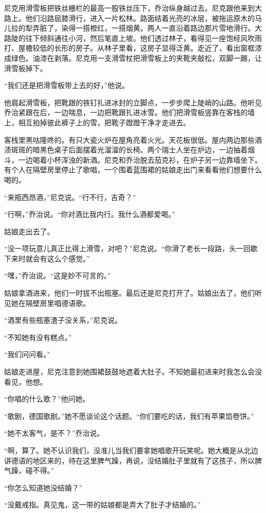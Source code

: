 尼克用滑雪板把铁丝栅栏的最高一股铁丝压下，乔治纵身越过去。尼克跟他来到大路上。他们沿路屈膝滑行，进入一片松林。路面结着光亮的冰层，被拖运原木的马儿拉的犁弄脏了，染得一搭橙红，一搭烟黄。两人一直沿着路边那片雪地滑行。大路陡的往下倾斜通往小河，然后笔直上坡。他们透过林子，看得见一座饱经风吹雨打、屋檐较低的长形的房子。从林子里看，这房子显得泛黄。走近了，看出窗框漆成绿色。油漆在剥落。尼克用一支滑雪杖把滑雪板上的夹靴夹敲松，双脚一踢，让滑雪板掉下。

“我们还是把滑雪板带上去的好，”他说。

他肩起滑雪板，把靴跟的铁钉扎进冰封的立脚点，一步步爬上陡峭的山路。他听见乔治紧跟在后，一边喘息，一边把靴跟扎进冰雪。他们把滑雪板竖靠在客栈的墙上，相互拍掉彼此裤子上的雪，把靴子蹬蹬干净才走进去。

客栈里黑咕隆咚的。有只大瓷火炉在屋角亮着火光。天花板很低。屋内两边那些酒渍斑斑的暗黑色桌子后面摆着光溜溜的长椅。两个瑞士人坐在炉边，一边抽着烟斗，一边喝着小杯浑浊的新酒。尼克和乔治脱去茄克衫，在炉子另一边靠墙坐下。有个人在隔壁房里停止了歌唱，一个围着蓝围裙的姑娘走出门来看看他们想要什么喝的。

“来瓶西昂酒，”尼克说。“行不行，吉奇？”

“行啊，”乔治说。“你对酒比我内行。我什么酒都爱喝。”

姑娘走出去了。

“没一项玩意儿真正比得上滑雪，对吧？”尼克说。“你滑了老长一段路，头一回歇下来时就会有这么个感觉。”

“嘿，”乔治说。“这是妙不可言的。”

姑娘拿酒进来，他们一时拔不出瓶塞。最后还是尼克打开了。姑娘出去了，他们听见她在隔壁房里唱德语歌。

“酒里有些瓶塞渣子没关系，”尼克说。

“不知她有没有糕点。”

“我们问问看。”

姑娘走进屋，尼克注意到她围裙鼓鼓地遮着大肚子。不知她最初进来时我怎么会没看见，他想。

“你唱的什么歌？”他问她。

“歌剧，德国歌剧。”她不愿谈论这个话题。“你们要吃的话，我们有苹果馅卷饼。”

“她不太客气，是不？”乔治说。

“啊，算了。她不认识我们，没准儿当我们要拿她唱歌开玩笑呢。她大概是从北边讲德语的地区来的，待在这里脾气躁，再说，没结婚肚子里就有了这孩子，所以脾气躁，碰不得。”

“你怎么知道她没结婚？”

“没戴戒指。真见鬼，这一带的姑娘都是弄大了肚子才结婚的。”

